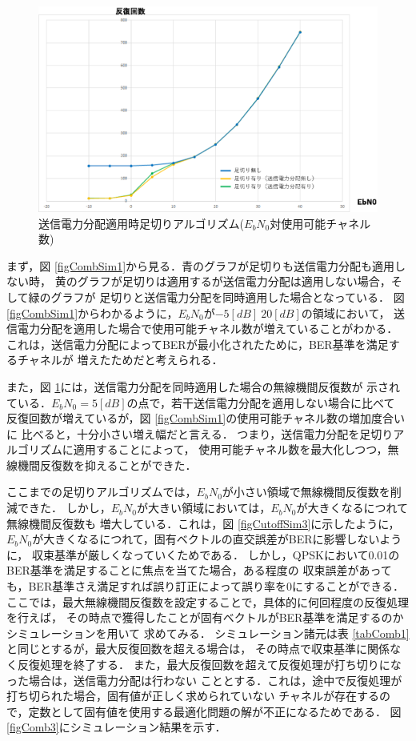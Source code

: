 \begin{figure}[ht]
    \centering
    \includegraphics[width=0.95\linewidth]{chapter4/figure/CombSim2.eps}
    \caption{送信電力分配適用時足切りアルゴリズム($E_bN_0$対使用可能チャネル数)}
    \label{figCombSim2}
\end{figure}

まず，図 \ref{figCombSim1}から見る．青のグラフが足切りも送信電力分配も適用しない時，
黄のグラフが足切りは適用するが送信電力分配は適用しない場合，そして緑のグラフが
足切りと送信電力分配を同時適用した場合となっている．
図 \ref{figCombSim1}からわかるように，$E_bN_0$が$-5[dB]~20[dB]$の領域において，
送信電力分配を適用した場合で使用可能チャネル数が増えていることがわかる．
これは，送信電力分配によってBERが最小化されたために，BER基準を満足するチャネルが
増えたためだと考えられる．

また，図 \ref{figCombSim2}には，送信電力分配を同時適用した場合の無線機間反復数が
示されている．$E_bN_0=5[dB]$の点で，若干送信電力分配を適用しない場合に比べて
反復回数が増えているが，図 \ref{figCombSim1}の使用可能チャネル数の増加度合いに
比べると，十分小さい増え幅だと言える．
つまり，送信電力分配を足切りアルゴリズムに適用することによって，
使用可能チャネル数を最大化しつつ，無線機間反復数を抑えることができた．

ここまでの足切りアルゴリズムでは，$E_bN_0$が小さい領域で無線機間反復数を削減できた．
しかし，$E_bN_0$が大きい領域においては，$E_bN_0$が大きくなるにつれて無線機間反復数も
増大している．これは，図 \ref{figCutoffSim3}に示したように，
$E_bN_0$が大きくなるにつれて，固有ベクトルの直交誤差がBERに影響しないように，
収束基準が厳しくなっていくためである．
しかし，QPSKにおいて0.01のBER基準を満足することに焦点を当てた場合，ある程度の
収束誤差があっても，BER基準さえ満足すれば誤り訂正によって誤り率を0にすることができる．
ここでは，最大無線機間反復数を設定することで，具体的に何回程度の反復処理を行えば，
その時点で獲得したことが固有ベクトルがBER基準を満足するのかシミュレーションを用いて
求めてみる．
シミュレーション諸元は表 \ref{tabComb1}と同じとするが，最大反復回数を超える場合は，
その時点で収束基準に関係なく反復処理を終了する．
また，最大反復回数を超えて反復処理が打ち切りになった場合は，送信電力分配は行わない
こととする．これは，途中で反復処理が打ち切られた場合，固有値が正しく求められていない
チャネルが存在するので，定数として固有値を使用する最適化問題の解が不正になるためである．
図 \ref{figComb3}にシミュレーション結果を示す．

